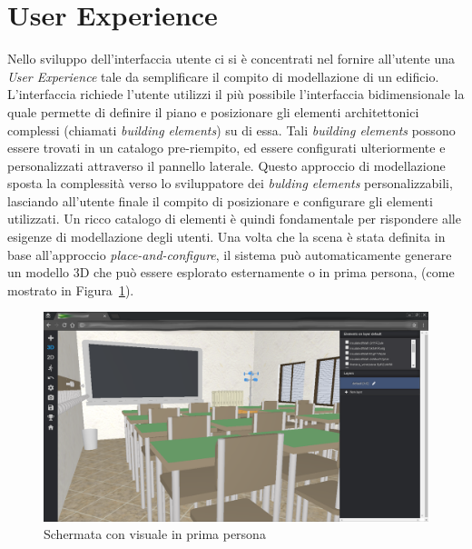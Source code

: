 \section{User Experience}
\label{sec:chapter_2_section_1}


Nello sviluppo dell'interfaccia utente ci si è concentrati nel fornire all'utente una \emph{User Experience} tale 
da semplificare il compito di modellazione di un edificio.
L'interfaccia richiede l'utente utilizzi il più possibile l'interfaccia bidimensionale la quale permette
di definire il piano e posizionare gli elementi architettonici complessi (chiamati \emph{building elements}) su di essa.
Tali \emph{building elements} possono essere trovati in un catalogo pre-riempito, ed essere
configurati ulteriormente e personalizzati attraverso il pannello laterale. Questo approccio
di modellazione sposta la complessità verso lo sviluppatore dei \emph{bulding elements} personalizzabili,
lasciando all'utente finale il compito di posizionare e configurare gli elementi utilizzati.
Un ricco catalogo di elementi \`e quindi fondamentale per rispondere alle esigenze di modellazione degli utenti.
Una volta che la scena \`e stata definita in base all'approccio \emph{place-and-configure}, il sistema pu\`o automaticamente
generare un modello 3D che pu\`o essere esplorato esternamente o in prima persona,
(come mostrato in Figura~\ref{fig:3D-school}).\\

\begin{figure}[htbp] %
   \centering
   \includegraphics[width=1\linewidth]{images/3d-school}
   \caption{Schermata con visuale in prima persona}
   \label{fig:3D-school}
\end{figure}

